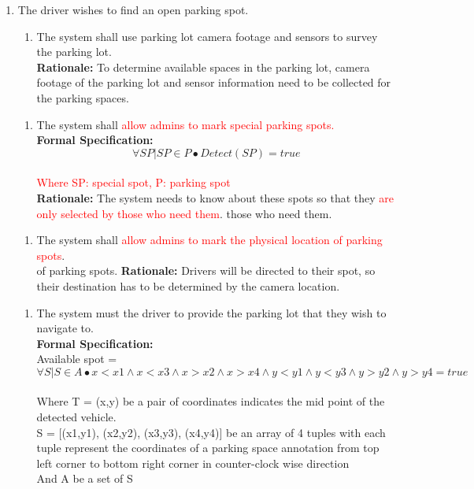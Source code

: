 \documentclass[12pt,letterpaper]{article}
\newcounter{businesseventnum}
\newcounter{funcreqnum}
\begin{document}
\begin{enumerate}[{BE}\thebusinesseventnum.] 
\item The driver wishes to find an open parking spot.
\begin{enumerate}[{FR}\thefuncreqnum.] 
    \item The system shall use parking lot camera footage and sensors to survey
    the parking lot. \label{poc1}\\
    \textbf{Rationale:} To determine available spaces in the parking lot, camera
    footage of the parking lot and sensor information need to be collected for
    the parking spaces.
\end{enumerate}
\begin{enumerate}[{FR}\thefuncreqnum.] 
    \item The system shall \textcolor{red}{allow admins to mark special parking
    spots.}\\ %
    \textbf{Formal Specification: } \[\forall SP | SP \in P  \bullet Detect(SP)
    = true\]\\
    \textcolor{red}{Where SP: special spot, P: parking spot}\\
    \textbf{Rationale:} The system needs to know about these spots so that they
    \textcolor{red}{are only selected by those who need them}.%
    those who need them.
\end{enumerate}
\begin{enumerate}[{FR}\thefuncreqnum.] 
    \item The system shall \textcolor{red}{allow admins to mark the physical
    location of parking spots}. \label{poc2}\\ %
    of parking spots. \textbf{Rationale:} Drivers will be directed to their
    spot, so their destination has to be determined by the camera location.
\end{enumerate}
\begin{enumerate}[{FR}\thefuncreqnum.] 
    \item The system must \color{red}{display all available parking lots and
    allow} the driver to provide the parking lot that they wish to navigate
    to.\\
    \textbf{Formal Specification: }  \\Available spot = \[\forall S | S \in A
    \bullet x < x1 \land  x < x3 \land x > x2 \land x > x4 \land y < y1 \land  y
    < y3 \land y > y2 \land y > y4 = true\]\\
    Where T = (x,y) be a pair of coordinates indicates the mid point of the
    detected vehicle.\\
    S = [(x1,y1), (x2,y2), (x3,y3), (x4,y4)] be an array of 4 tuples with each
    tuple represent the coordinates of a parking space annotation from top left
    corner to bottom right corner in counter-clock wise direction\\
    And A be a set of S\\
   

\end{enumerate}
\end{enumerate}
\end{document}
